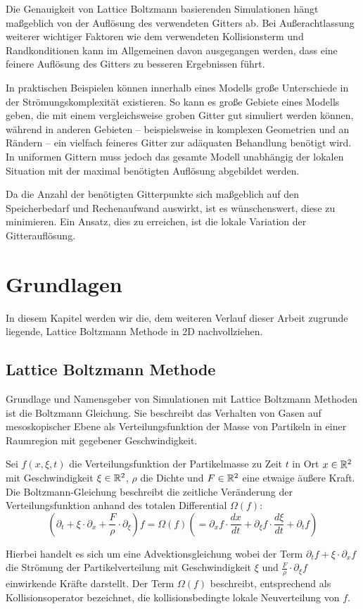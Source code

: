 Die Genauigkeit von Lattice Boltzmann basierenden Simulationen hängt maßgeblich von der Auflösung des verwendeten Gitters ab. Bei Außerachtlassung weiterer wichtiger Faktoren wie dem verwendeten Kollisionsterm und Randkonditionen kann im Allgemeinen davon ausgegangen werden, dass eine feinere Auflösung des Gitters zu besseren Ergebnissen führt.

In praktischen Beispielen können innerhalb eines Modells große Unterschiede in der Strömungskomplexität existieren. So kann es große Gebiete eines Modells geben, die mit einem vergleichsweise groben Gitter gut simuliert werden können, während in anderen Gebieten -- beispielsweise in komplexen Geometrien und an Rändern -- ein vielfach feineres Gitter zur adäquaten Behandlung benötigt wird. In uniformen Gittern muss jedoch das gesamte Modell unabhängig der lokalen Situation mit der maximal benötigten Auflösung abgebildet werden.

Da die Anzahl der benötigten Gitterpunkte sich maßgeblich auf den Speicherbedarf und Rechenaufwand auswirkt, ist es wünschenswert, diese zu minimieren. Ein Ansatz, dies zu erreichen, ist die lokale Variation der Gitterauflösung.

\newpage
\section{Grundlagen}

In diesem Kapitel werden wir die, dem weiteren Verlauf dieser Arbeit zugrunde liegende, Lattice Boltzmann Methode in 2D nachvollziehen.

\subsection{Lattice Boltzmann Methode}\label{kap:LBM}

Grundlage und Namensgeber von Simulationen mit Lattice Boltzmann Methoden ist die Boltzmann Gleichung. Sie beschreibt das Verhalten von Gasen auf mesoskopischer Ebene als Verteilungsfunktion der Masse von Partikeln in einer Raumregion mit gegebener Geschwindigkeit.

\begin{Definition}
Sei \(f(x,\xi,t)\) die Verteilungsfunktion der Partikelmasse zu Zeit \(t\) in Ort \(x \in \mathbb{R}^2\) mit Geschwindigkeit \(\xi \in \mathbb{R}^2\), \(\rho\) die Dichte und \(F \in \mathbb{R}^2\) eine etwaige äußere Kraft. Die Boltzmann-Gleichung beschreibt die zeitliche Veränderung der Verteilungsfunktion anhand des totalen Differential \(\Omega(f)\):
\[ \left( \partial_t + \xi \cdot \partial_x + \frac{F}{\rho} \cdot \partial_\xi \right) f = \Omega(f) \left( = \partial_x f \cdot \frac{dx}{dt} + \partial_\xi f \cdot \frac{d\xi}{dt} + \partial_t f \right) \]

Hierbei handelt es sich um eine Advektionsgleichung wobei der Term \(\partial_t f + \xi \cdot \partial_x f\) die Strömung der Partikelverteilung mit Geschwindigkeit \(\xi\) und \(\frac{F}{\rho} \cdot \partial_\xi f\) einwirkende Kräfte darstellt. Der Term \(\Omega(f)\) beschreibt, entsprechend als Kollisionsoperator bezeichnet, die kollisionsbedingte lokale Neuverteilung von \(f\).
\end{Definition}

